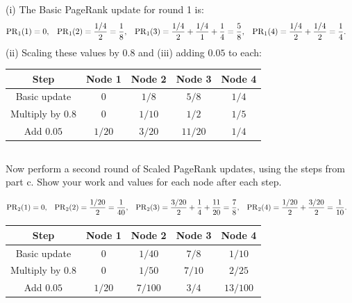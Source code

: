 \documentclass[newpages]{assignment}
\begin{document}
(i) The Basic PageRank update for round 1 is:
\[
    \begin{aligned}
        \operatorname{PR}_1(1) & =0,                                           &
        \operatorname{PR}_1(2) & =\frac{1/4}{2}=\frac18,                       &
        \operatorname{PR}_1(3) & =\frac{1/4}{2}+\frac{1/4}{1}+\frac14=\frac58, &
        \operatorname{PR}_1(4) & =\frac{1/4}{2}+\frac{1/4}{2}=\frac14.
    \end{aligned}
\]
(ii) Scaling these values by $0.8$ and (iii) adding $0.05$ to each:
\begin{center}
    \begin{tabular}{ccccc}
        \toprule
        Step              & Node 1 & Node 2 & Node 3  & Node 4 \\
        \midrule
        Basic update      & $0$    & $1/8$  & $5/8$   & $1/4$  \\
        Multiply by $0.8$ & $0$    & $1/10$ & $1/2$   & $1/5$  \\
        Add $0.05$        & $1/20$ & $3/20$ & $11/20$ & $1/4$  \\
        \bottomrule
    \end{tabular}
\end{center}

\subsection{}
\begin{problem}
    Now perform a second round of Scaled PageRank updates, using the steps from part c. Show your work and values for each node after each step.
\end{problem}

\[
    \begin{aligned}
        \operatorname{PR}_2(1) & =0,                                            &
        \operatorname{PR}_2(2) & =\frac{1/20}{2}=\frac1{40},                    &
        \operatorname{PR}_2(3) & =\frac{3/20}{2}+\frac14+\frac{11}{20}=\frac78, &
        \operatorname{PR}_2(4) & =\frac{1/20}{2}+\frac{3/20}{2}=\frac1{10}.
    \end{aligned}
\]
\begin{center}
    \begin{tabular}{ccccc}
        \toprule
        Step              & Node 1 & Node 2  & Node 3 & Node 4   \\
        \midrule
        Basic update      & $0$    & $1/40$  & $7/8$  & $1/10$   \\
        Multiply by $0.8$ & $0$    & $1/50$  & $7/10$ & $2/25$   \\
        Add $0.05$        & $1/20$ & $7/100$ & $3/4$  & $13/100$ \\
        \bottomrule
    \end{tabular}
\end{center}
\end{document}
